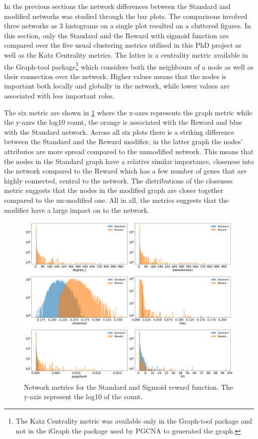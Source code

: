 In the previous sections the network differences between the Standard and modified networks was studied through the bar plots. The comparisons involved three networks as 3 histograms on a single plot resulted on a cluttered figures. In this section, only the Standard and the Reward with sigmoid function are compared over the five usual clustering metrics utilised in this PhD project as well as the Katz Centrality metrics. The latter is a centrality metric available in the Graph-tool package\footnote{The Katz Centrality metric was available only in the Graph-tool package and not in the iGraph the package used by PGCNA to generated the graph.} which considers both the neighbours of a node as well as their connection over the network. Higher values means that the nodes is important both locally and globally in the network, while lower values are associated with less important roles. 

The six metric are shown in \cref{fig:N_II:net_metric_sig_std} where the x-axes represents the graph metric while the y-axes the log10 count, the orange is associated with the Reward and blue with the Standard network. Across all six plots there is a striking difference between the Standard and the Reward modifier,  in the latter graph the nodes' attributes are more spread compared to the unmodified network. This means that the nodes in the Standard graph have a relative similar importance, closeness into the network compared to the Reward which has a few number of genes that are highly connected, central to the network.
The distributions of the closeness metric suggests that the nodes in the modified graph are closer together compared to the un-modified one. All in all, the metrics suggests that the modifier have a large impact on to the network.


\begin{figure}[H]    
    \centering
    \includegraphics[width=1.0\textwidth,height=1.0\textheight,keepaspectratio]{Sections/Network_II/validation/net_metrics_Standard_Reward.png}
    \caption{Network metrics for the Standard and Sigmoid reward function. The y-axis represent the log10 of the count. }
    \label{fig:N_II:net_metric_sig_std}
\end{figure}


